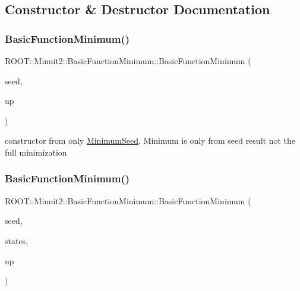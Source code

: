 \subsection{Constructor \& Destructor Documentation}
\mbox{\label{classROOT_1_1Minuit2_1_1BasicFunctionMinimum_a7482d18115a4dc6cd3a0690074c7bbb7}} 
\subsubsection{\texorpdfstring{BasicFunctionMinimum()}{BasicFunctionMinimum()}\hspace{0.1cm}{\footnotesize\ttfamily [1/15]}}
{\footnotesize\ttfamily R\+O\+O\+T\+::\+Minuit2\+::\+Basic\+Function\+Minimum\+::\+Basic\+Function\+Minimum (\begin{DoxyParamCaption}\item[{const \mbox{\hyperlink{classROOT_1_1Minuit2_1_1MinimumSeed}{Minimum\+Seed}} \&}]{seed,  }\item[{double}]{up }\end{DoxyParamCaption})\hspace{0.3cm}{\ttfamily [inline]}}



constructor from only \mbox{\hyperlink{classROOT_1_1Minuit2_1_1MinimumSeed}{Minimum\+Seed}}. Minimum is only from seed result not the full minimization 

\mbox{\label{classROOT_1_1Minuit2_1_1BasicFunctionMinimum_a8a2f91243b896e3fe682c19ccd57a9bc}} 
\subsubsection{\texorpdfstring{BasicFunctionMinimum()}{BasicFunctionMinimum()}\hspace{0.1cm}{\footnotesize\ttfamily [2/15]}}
{\footnotesize\ttfamily R\+O\+O\+T\+::\+Minuit2\+::\+Basic\+Function\+Minimum\+::\+Basic\+Function\+Minimum (\begin{DoxyParamCaption}\item[{const \mbox{\hyperlink{classROOT_1_1Minuit2_1_1MinimumSeed}{Minimum\+Seed}} \&}]{seed,  }\item[{const std\+::vector$<$ \mbox{\hyperlink{classROOT_1_1Minuit2_1_1MinimumState}{Minimum\+State}} $>$ \&}]{states,  }\item[{double}]{up }\end{DoxyParamCaption})\hspace{0.3cm}{\ttfamily [inline]}}



